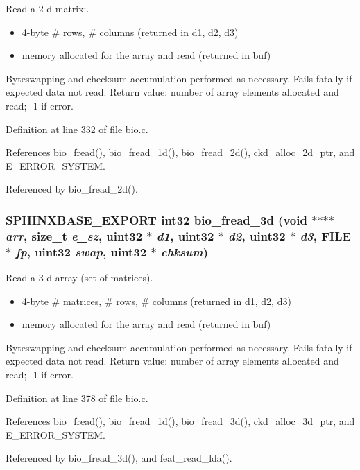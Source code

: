Read a 2-d matrix:. 

\begin{itemize}
\item 4-byte \# rows, \# columns (returned in d1, d2, d3)\item memory allocated for the array and read (returned in buf)\end{itemize}


Byteswapping and checksum accumulation performed as necessary. Fails fatally if expected data not read. Return value: number of array elements allocated and read; -1 if error. 

Definition at line 332 of file bio.c.

References bio\_\-fread(), bio\_\-fread\_\-1d(), bio\_\-fread\_\-2d(), ckd\_\-alloc\_\-2d\_\-ptr, and E\_\-ERROR\_\-SYSTEM.

Referenced by bio\_\-fread\_\-2d().
\subsubsection[{bio\_\-fread\_\-3d}]{\setlength{\rightskip}{0pt plus 5cm}SPHINXBASE\_\-EXPORT int32 bio\_\-fread\_\-3d (void $\ast$$\ast$$\ast$$\ast$ {\em arr}, \/  size\_\-t {\em e\_\-sz}, \/  uint32 $\ast$ {\em d1}, \/  uint32 $\ast$ {\em d2}, \/  uint32 $\ast$ {\em d3}, \/  FILE $\ast$ {\em fp}, \/  uint32 {\em swap}, \/  uint32 $\ast$ {\em chksum})}\label{bio_8h_ca6a6b71d02b9e5ca6b136a28640e0c1}


Read a 3-d array (set of matrices). 

\begin{itemize}
\item 4-byte \# matrices, \# rows, \# columns (returned in d1, d2, d3)\item memory allocated for the array and read (returned in buf)\end{itemize}


Byteswapping and checksum accumulation performed as necessary. Fails fatally if expected data not read. Return value: number of array elements allocated and read; -1 if error. 

Definition at line 378 of file bio.c.

References bio\_\-fread(), bio\_\-fread\_\-1d(), bio\_\-fread\_\-3d(), ckd\_\-alloc\_\-3d\_\-ptr, and E\_\-ERROR\_\-SYSTEM.

Referenced by bio\_\-fread\_\-3d(), and feat\_\-read\_\-lda().
